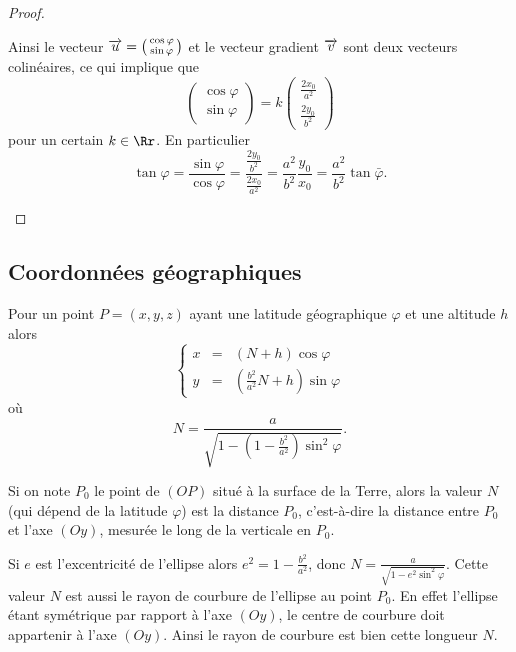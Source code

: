 \documentclass[class=report,crop=false]{standalone}
\begin{document}
\begin{proof}
\begin{enumerate}
  Ainsi le vecteur 
  $\overrightarrow u = \left(\begin{smallmatrix}\cos \varphi \\ \sin \varphi \end{smallmatrix}\right)$ et le vecteur 
  gradient $\overrightarrow v$ sont deux vecteurs colinéaires, ce qui implique que
  $$\begin{pmatrix}\cos \varphi \\ \sin \varphi \end{pmatrix} = k \begin{pmatrix}\frac{2x_0}{a^2} \\ \frac{2y_0}{b^2} \end{pmatrix}$$
  pour un certain $k\in\Rr$. En particulier 
  $$\tan \varphi = \frac{\sin\varphi}{\cos\varphi} 
  = \frac{\frac{2y_0}{b^2}}{\frac{2x_0}{a^2}} = \frac{a^2}{b^2}\frac{y_0}{x_0}= \frac{a^2}{b^2} \tan \bar\varphi.$$
\end{enumerate}

\end{proof}


\subsection{Coordonnées géographiques}


\begin{theoreme}
Pour un point $P = (x,y,z)$ ayant une latitude géographique $\varphi$ et une altitude $h$
alors
$$\left\{ 
\begin{array}{rcl}
x &=& (N+h) \cos \varphi \\
y &=& \left(\frac{b^2}{a^2}N+h\right)\sin\varphi 
\end{array}
\right.$$
où 
$$N = \frac{a}{\sqrt{1-\left(1-\frac{b^2}{a^2}\right)\sin^2 \varphi}}.$$
\end{theoreme}

Si on note $P_0$ le point de $(OP)$ situé à la surface de la Terre, alors 
la valeur $N$ (qui dépend de la latitude $\varphi$) est la distance $P_0$, c'est-à-dire la distance entre 
$P_0$ et l'axe $(Oy)$, mesurée le long de la verticale en $P_0$.




Si $e$ est l'excentricité de l'ellipse alors $e^2 = 1-\frac{b^2}{a^2}$, donc 
$N= \frac{a}{\sqrt{1-e^2\sin^2 \varphi}}$.
Cette valeur $N$ est aussi le rayon de courbure de l'ellipse au point $P_0$. En effet
l'ellipse étant symétrique par rapport à l'axe $(Oy)$, le centre de courbure doit appartenir à l'axe $(Oy)$.
Ainsi le rayon de courbure est bien cette longueur $N$.
\end{document}
